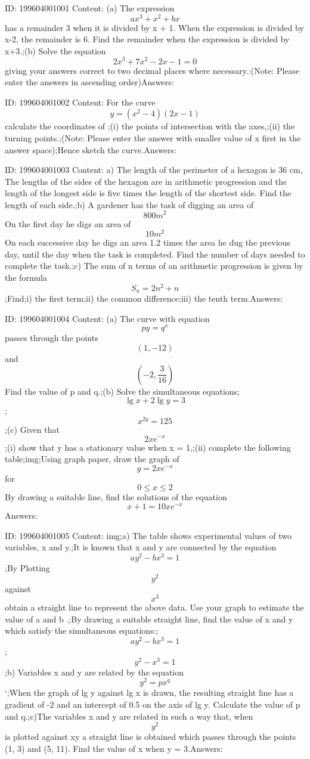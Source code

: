 \documentclass{article}
\begin{document}
ID: 199604001001
Content:
(a) The expression \[ax^3+x^2+bx\] has a remainder 3 when it is divided by x + 1. When the expression is divided by x-2, the remainder is 6. Find the remainder when the expression is divided by x+3.;(b) Solve the equation \[2x^3+7x^2-2x-1=0\] giving your answers correct to two decimal places where necessary.:(Note: Please enter the answers in ascending order)Answers:

ID: 199604001002
Content:
For the curve \[y=(x^2-4)(2x-1)\] calculate the coordinates of ;(i)	the points of intersection with the axes,;(ii)	the turning points.;(Note: Please enter the answer with smaller value of x first in the answer space);Hence sketch the curve.Answers:

ID: 199604001003
Content:
a) The length of the perimeter of a hexagon is 36 cm, The lengths of the sides of the hexagon are in arithmetic progression and the length of the longest side is five times the length of the shortest side. Find the length of each side.;b) A gardener has the task of digging an area of \[800m^2\] On the first day he digs an area of \[10m^2\] On each successive day he digs an area 1.2 times the area he dug the previous day, until the day when the task is completed. Find the number of days needed to complete the task.;c) The sum of n terms of an arithmetic progression is given by the formula \[S_n=2n^2+n\];Find;i) the first term;ii) the common difference;iii) the tenth term.Answers:

ID: 199604001004
Content:
(a)	The curve with equation \[py=q^x\] passes through the points \[(1, -12) \]and \[(-2,\frac{3}{16})\] Find the value of p and q.;(b)	Solve the simultaneous equations; \[\lg x+2\lg y=3\]; \[x^{2y}=125\] ;(c)	Given that \[2xe^{-x}\];(i)	show that y has a stationary value when x = 1,;(ii)	complete the following table;img;Using graph paper, draw the graph of \[y=2xe^{-x}\] for \[0\leq x\leq 2\]  By drawing a suitable line, find the solutions of the equation \[x+1=10xe^{-x}\]Answers:

ID: 199604001005
Content:
img;a) The table shows experimental values of two variables, x and y.;It is known that x and y are connected by the equation \[ay^2-bx^3=1\];By Plotting \[y^2\] against \[x^3\] obtain a straight line to represent the above data. Use your graph to estimate the value of a and b .;By drawing a suitable straight line, find the value of x and y which satisfy the simultaneous equations:; \[ay^2-bx^3=1\] ; \[y^2-x^3=1\];b) Variables x and y are related by the equation \[y^2 = px^q\] `;When the graph of lg y against lg x is drawn, the resulting straight line has a gradient of -2 and an intercept of 0.5 on the axis of lg y. Calculate the value of p and q.;c)The variables x and y are related in such a way that, when \[y^2\] is plotted against xy a straight line is obtained which passes through the points (1, 3) and (5, 11). Find the value of x when y = 3.Answers:
\end{document}
